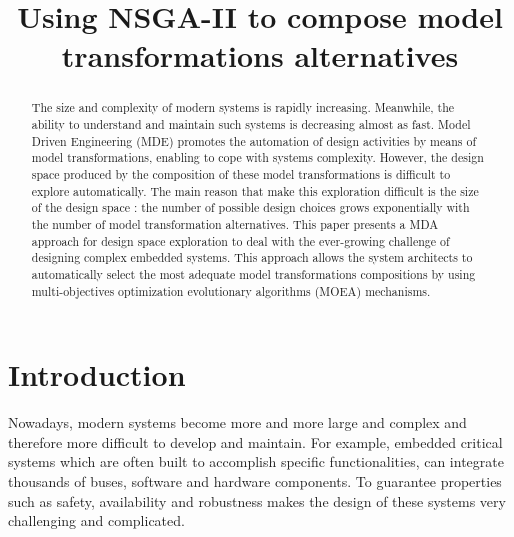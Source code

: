 \documentclass[conference]{IEEEtran}
\begin{document}
\title{Using NSGA-II to compose model transformations alternatives }

\author{
\and
{}
}

\maketitle

\begin{abstract}
The size and complexity of modern systems is rapidly increasing. Meanwhile, the ability to understand and maintain such systems is decreasing almost as fast.
Model Driven Engineering (MDE) promotes the automation of design activities by means of model transformations, enabling to cope with systems complexity. However, the design space produced by the composition of these model transformations is difficult to explore automatically. The main reason that make this exploration difficult is the size of the design space : the number of possible design choices grows exponentially with the number of model transformation alternatives.
This paper presents a MDA approach for design space exploration to deal with the ever-growing challenge of designing complex embedded systems. This approach allows the system architects to automatically select the most adequate model transformations compositions by using multi-objectives optimization evolutionary algorithms (MOEA) mechanisms.

\end{abstract}

\IEEEpeerreviewmaketitle

\section{Introduction}
Nowadays, modern systems become more and more large and complex and therefore more difficult to develop and maintain. For example, embedded critical systems which are often built to accomplish specific functionalities, can integrate thousands of buses, software and hardware components. To guarantee properties such as safety, availability and robustness makes the design of these systems very challenging and complicated.
\end{document}
